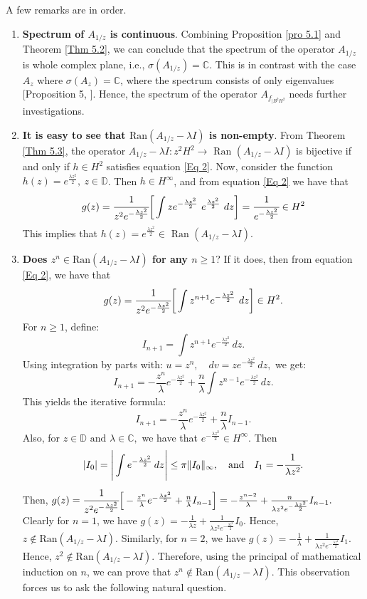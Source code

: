 \documentclass[preprint,12pt]{elsarticle} %
\theoremstyle{plain}
\theoremstyle{definition}
\theoremstyle{remark}
\begin{document}
A few remarks are in order.
\begin{enumerate}
    \item  \textbf{Spectrum of $A_{1/z}$ is continuous}. Combining Proposition \ref{pro 5.1} and Theorem \ref{Thm 5.2}, we can conclude that the spectrum of the operator $A_{1/z}$ is whole complex plane, i.e., $\sigma(A_{1/z})=\mathbb{C}$. This is in contrast with the case $A_z$ where $\sigma(A_z)=\mathbb{C}$, where the spectrum consists of only eigenvalues [Proposition 5, \cite{russo2022liouville}]. Hence, the spectrum of the operator $A_{f_{|B^2 H^2}}$ needs further investigations.\\
    
    \item \textbf{It is easy to see that $\text{Ran}(A_{1/z}-\lambda I)$ is non-empty}. From Theorem \ref{Thm 5.3}, the operator $A_{1/z}-\lambda I: z^2 H^2\rightarrow \text{~Ran~}(A_{1/z}-\lambda I)$ is bijective if and only if $h\in H^2$ satisfies equation \ref{Eq 2}. Now, consider the function $h(z)=e^{ \frac{\lambda z^2}{2}}, ~z\in \mathbb{D}$. Then $h\in H^{\infty}$, and from equation \ref{Eq 2} we have that
    $$
g(z)=\cfrac{1}{z^2 e^{- \frac{\lambda z^2}{2}}}\bigg[\int z e^{- \frac{\lambda z^2}{2}}~e^{ \frac{\lambda z^2}{2}}~dz\bigg]= \cfrac{1}{ e^{- \frac{\lambda z^2}{2}}} \in H^2
    $$
    This implies that $h(z)=e^{ \frac{\lambda z^2}{2}}\in \text{~Ran~}(A_{1/z}-\lambda I)$.\\

    \item \textbf{Does $z^n \in \text{Ran}(A_{1/z}-\lambda I)$ for any $n\geq 1$}? If it does, then from equation \ref{Eq 2}, we have that
    $$
g(z)=\cfrac{1}{z^2 e^{- \frac{\lambda z^2}{2}}}\bigg[\int z^{n+1} e^{- \frac{\lambda z^2}{2}}~dz\bigg] \in H^2.
    $$
    For \( n \geq 1 \), define:
\[
I_{n+1} = \int z^{n+1} e^{-\frac{\lambda z^2}{2}} \, dz.
\]
Using integration by parts with:
$u = z^{n}, \quad dv = z e^{-\frac{\lambda z^2}{2}} \, dz,$
we get:
$$
I_{n+1} = -\frac{z^{n}}{\lambda} e^{-\frac{\lambda z^2}{2}} + \frac{n}{\lambda} \int z^{n-1} e^{-\frac{\lambda z^2}{2}} \, dz.
$$
This yields the iterative formula:
$$
\boxed{I_{n+1} = -\frac{z^{n}}{\lambda} e^{-\frac{\lambda z^2}{2}} + \frac{n}{\lambda} I_{n-1}.}
$$
Also, for $z\in \mathbb{D}\text{~and~}\lambda \in \mathbb{C},$ we have that $ e^{-\frac{\lambda z^2}{2}}\in H^{\infty}$. Then 
$$
|I_0|= \Bigg|\int  e^{-\frac{\lambda z^2}{2}} \, dz \Bigg|\leq \pi \|I_0\|_{\infty}, \text{~~~and~~~} I_1=-\cfrac{1}{\lambda z^2}.
$$
Then, $g(z)=\cfrac{1}{z^2 e^{- \frac{\lambda z^2}{2}}}\Big[-\frac{z^{n}}{\lambda} e^{-\frac{\lambda z^2}{2}} + \frac{n}{\lambda} I_{n-1}\Big]= -\frac{z^{n-2}}{\lambda} + \frac{n}{\lambda z^2 e^{- \frac{\lambda z^2}{2}}} I_{n-1}.$ Clearly for $n=1$, we have $g(z)=-\frac{1}{\lambda z}+ \frac{1}{\lambda z^2 e^{- \frac{\lambda z^2}{2}}}I_0$. Hence, $z\notin \text{Ran}(A_{1/z}-\lambda I)$. Similarly, for $n=2$, we have $g(z)=-\frac{1}{\lambda }+ \frac{1}{\lambda z^2 e^{- \frac{\lambda z^2}{2}}}I_1$. Hence, $z^2 \notin \text{Ran}(A_{1/z}-\lambda I)$. Therefore, using the principal of mathematical induction on $n$, we can prove that $z^n \notin \text{Ran}(A_{1/z}-\lambda I)$. This observation forces us to ask the following natural question.



\end{enumerate}
\end{document}
